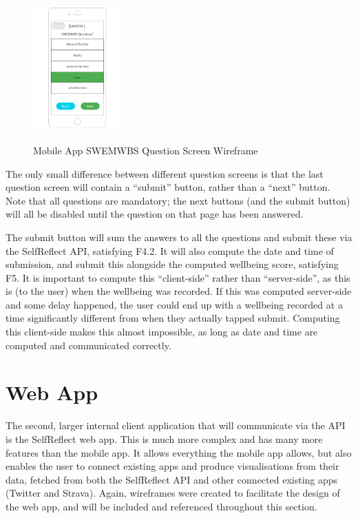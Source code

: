 \documentclass[11pt,openright,a4paper]{report}
\begin{document}
\begin{figure}[ht]
\centering
\caption{Mobile App SWEMWBS Question Screen Wireframe}
\includegraphics[width=0.3\textwidth]{i/mobilequestion.png}
\label{fig:mobilequestion}
\end{figure}

The only small difference between different question screens is that the last question screen will contain a \enquote{submit} button, rather than a \enquote{next} button. Note that all questions are mandatory; the next buttons (and the submit button) will all be disabled until the question on that page has been answered.

The submit button will sum the answers to all the questions and submit these via the SelfReflect API, satisfying F4.2. It will also compute the date and time of submission, and submit this alongside the computed wellbeing score, satisfying F5. It is important to compute this \enquote{client-side} rather than \enquote{server-side}, as this is (to the user) when the wellbeing was recorded. If this was computed server-side and some delay happened, the user could end up with a wellbeing recorded at a time significantly different from when they actually tapped submit. Computing this client-side makes this almost impossible, as long as date and time are computed and communicated correctly.

\section{Web App}
The second, larger internal client application that will communicate via the API is the SelfReflect web app. This is much more complex and has many more features than the mobile app. It allows everything the mobile app allows, but also enables the user to connect existing apps and produce visualisations from their data, fetched from both the SelfReflect API and other connected existing apps (Twitter and Strava). Again, wireframes were created to facilitate the design of the web app, and will be included and referenced throughout this section.
\end{document}
